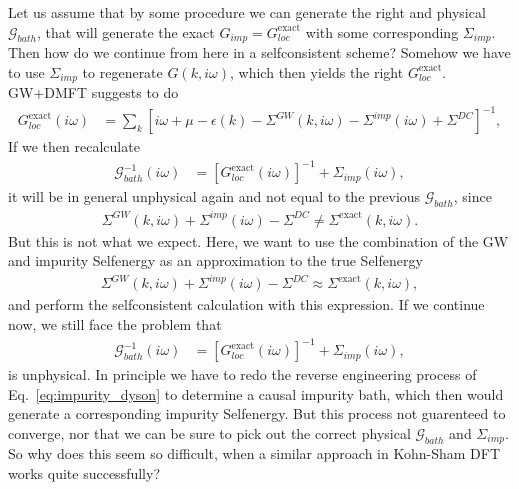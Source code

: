 \documentclass[12pt,a4paper]{scrartcl}
\numberwithin{equation}{section}
\begin{document}
Let us assume that by some procedure we can generate the right and physical
$\mathcal{G}_{bath}$, that will generate the exact $G_{imp}=G^{\mathrm{exact}}_{loc}$
with some corresponding $\Sigma_{imp}$.
Then how do we continue from here in a selfconsistent scheme?
Somehow we have to use $\Sigma_{imp}$ to regenerate $G(k,i\omega)$, which then 
yields the right $G^{\mathrm{exact}}_{loc}$.
GW+DMFT suggests to do
\begin{align}
  G^{\mathrm{exact}}_{loc}(i\omega)
 &= \sum_{k} \left[ i\omega + \mu - \epsilon(k) - \Sigma^{GW}(k,i\omega)-\Sigma^{imp}(i\omega)+\Sigma^{DC} \right]^{-1},
\end{align}
If we then recalculate
\begin{align}
 \mathcal{G}^{-1}_{bath}(i\omega) 
 &= \left[G^{\mathrm{exact}}_{loc} (i\omega)\right]^{-1} + \Sigma_{imp}(i\omega),
\end{align}
it will be in general unphysical again and not equal to the previous $\mathcal{G}_{bath}$,
since 
\begin{align}
 \Sigma^{GW}(k,i\omega)+\Sigma^{imp}(i\omega)-\Sigma^{DC} \neq \Sigma^{\mathrm{exact}}(k,i\omega).
\end{align}
But this is not what we expect. Here, we want to use the combination of the GW
and impurity Selfenergy as an approximation to the true Selfenergy
\begin{align}
 \Sigma^{GW}(k,i\omega)+\Sigma^{imp}(i\omega)-\Sigma^{DC} \approx \Sigma^{\mathrm{exact}}(k,i\omega),
\end{align}
and perform the selfconsistent calculation with this expression.
If we continue now, we still face the problem that 
\begin{align}
 \mathcal{G}^{-1}_{bath}(i\omega) 
 &= \left[G^{\mathrm{exact}}_{loc} (i\omega)\right]^{-1} + \Sigma_{imp}(i\omega),
\end{align}
is unphysical. In principle we have to 
redo the reverse engineering process of Eq.~\eqref{eq:impurity_dyson} to determine 
a causal impurity bath, which then would generate a corresponding impurity Selfenergy.
But this process  not guarenteed to converge, nor that we can be sure
to pick out the correct physical $\mathcal{G}_{bath}$ and $\Sigma_{imp}$.
So why does this seem so difficult, when a similar approach in 
Kohn-Sham DFT works quite successfully?

\bigskip
\end{document}
